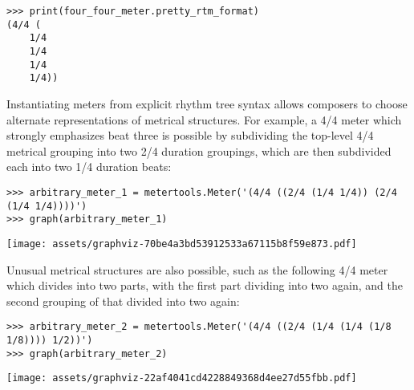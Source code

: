 \begin{singlespacing}
\vspace{-0.5\baselineskip}
\begin{lstlisting}
>>> print(four_four_meter.pretty_rtm_format)
(4/4 (
	1/4
	1/4
	1/4
	1/4))
\end{lstlisting}
\end{singlespacing}

Instantiating meters from explicit rhythm tree syntax allows composers to
choose alternate representations of metrical structures. For example, a 4/4
meter which strongly emphasizes beat three is possible by subdividing the
top-level 4/4 metrical grouping into two 2/4 duration groupings, which are then
subdivided each into two 1/4 duration beats:

\begin{comment}
<abjad>
arbitrary_meter_1 = metertools.Meter('(4/4 ((2/4 (1/4 1/4)) (2/4 (1/4 1/4))))')
graph(arbitrary_meter_1)
</abjad>
\end{comment}

\begin{singlespacing}
\vspace{-0.5\baselineskip}
\begin{lstlisting}
>>> arbitrary_meter_1 = metertools.Meter('(4/4 ((2/4 (1/4 1/4)) (2/4 (1/4 1/4))))')
>>> graph(arbitrary_meter_1)
\end{lstlisting}
\texttt{[image: assets/graphviz-70be4a3bd53912533a67115b8f59e873.pdf]}
\end{singlespacing}

\noindent Unusual metrical structures are also possible, such as the following
4/4 meter which divides into two parts, with the first part dividing into two
again, and the second grouping of that divided into two again:

\begin{comment}
<abjad>
arbitrary_meter_2 = metertools.Meter('(4/4 ((2/4 (1/4 (1/4 (1/8 1/8)))) 1/2))')
graph(arbitrary_meter_2)
</abjad>
\end{comment}

\begin{singlespacing}
\vspace{-0.5\baselineskip}
\begin{lstlisting}
>>> arbitrary_meter_2 = metertools.Meter('(4/4 ((2/4 (1/4 (1/4 (1/8 1/8)))) 1/2))')
>>> graph(arbitrary_meter_2)
\end{lstlisting}
\texttt{[image: assets/graphviz-22af4041cd4228849368d4ee27d55fbb.pdf]}
\end{singlespacing}

